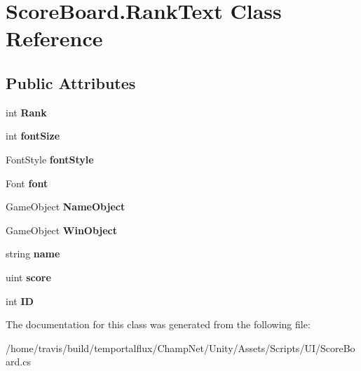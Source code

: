 \hypertarget{class_score_board_1_1_rank_text}{\section{Score\-Board.\-Rank\-Text Class Reference}
\label{class_score_board_1_1_rank_text}
}
\subsection*{Public Attributes}
\begin{DoxyCompactItemize}
\item 
\hypertarget{class_score_board_1_1_rank_text_ad1bb11aeb2005a31c4202c82958dd899}{int {\bfseries Rank}}\label{class_score_board_1_1_rank_text_ad1bb11aeb2005a31c4202c82958dd899}

\item 
\hypertarget{class_score_board_1_1_rank_text_a7cd14f47e2a22acedbecf27fd100f8fd}{int {\bfseries font\-Size}}\label{class_score_board_1_1_rank_text_a7cd14f47e2a22acedbecf27fd100f8fd}

\item 
\hypertarget{class_score_board_1_1_rank_text_a7fe435f4d04ade5af1b00d67a523cfdf}{Font\-Style {\bfseries font\-Style}}\label{class_score_board_1_1_rank_text_a7fe435f4d04ade5af1b00d67a523cfdf}

\item 
\hypertarget{class_score_board_1_1_rank_text_adbf90323214eddb0b4d7fc5287ad7549}{Font {\bfseries font}}\label{class_score_board_1_1_rank_text_adbf90323214eddb0b4d7fc5287ad7549}

\item 
\hypertarget{class_score_board_1_1_rank_text_ae8f670f701a8007114c80981c4bf3ce7}{Game\-Object {\bfseries Name\-Object}}\label{class_score_board_1_1_rank_text_ae8f670f701a8007114c80981c4bf3ce7}

\item 
\hypertarget{class_score_board_1_1_rank_text_a558c65dcc4b67d850be54e47dc91fff0}{Game\-Object {\bfseries Win\-Object}}\label{class_score_board_1_1_rank_text_a558c65dcc4b67d850be54e47dc91fff0}

\item 
\hypertarget{class_score_board_1_1_rank_text_a6f7701cb446d574c4a5ea7cec611ba2b}{string {\bfseries name}}\label{class_score_board_1_1_rank_text_a6f7701cb446d574c4a5ea7cec611ba2b}

\item 
\hypertarget{class_score_board_1_1_rank_text_a13ad6b821540d3fce3650a4590dabfc5}{uint {\bfseries score}}\label{class_score_board_1_1_rank_text_a13ad6b821540d3fce3650a4590dabfc5}

\item 
\hypertarget{class_score_board_1_1_rank_text_a370ca923374efc2137c9d54c38f7901e}{int {\bfseries I\-D}}\label{class_score_board_1_1_rank_text_a370ca923374efc2137c9d54c38f7901e}

\end{DoxyCompactItemize}


The documentation for this class was generated from the following file\-:\begin{DoxyCompactItemize}
\item 
/home/travis/build/temportalflux/\-Champ\-Net/\-Unity/\-Assets/\-Scripts/\-U\-I/Score\-Board.\-cs\end{DoxyCompactItemize}
